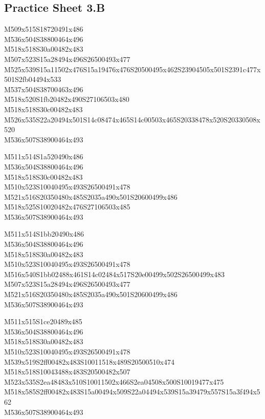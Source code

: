 \documentclass{article}
\begin{document}
\subsection{Practice Sheet 3.B}

\begin{multicols}{5}
\begin{center}

M509x515S18720491x486 %
\\M536x504S38800464x496 %
\\M518x518S30a00482x483 %
\\M507x523S15a28494x496S26500493x477 %
\\M525x539S15a11502x476S15a19476x476S20500495x462S23904505x501S2391c477x501S2fb04494x533 %
\\M537x504S38700463x496 %
\\M518x520S1fb20482x490S27106503x480 %
\\M518x518S30c00482x483 %
\\M526x535S22a20494x501S14c08474x465S14c00503x465S20338478x520S20330508x520 %
\\M536x507S38900464x493 %
\vfil
\columnbreak

M511x514S1a520490x486 %
\\M536x504S38800464x496 %
\\M518x518S30c00482x483 %
\\M510x523S10040495x493S26500491x478 %
\\M521x516S20350480x485S2035a490x501S20600499x486 %
\\M518x525S10020482x476S27106503x485 %
\\M536x507S38900464x493 %
\vfil
\columnbreak

M511x514S1bb20490x486 %
\\M536x504S38800464x496 %
\\M518x518S30a00482x483 %
\\M510x523S10040495x493S26500491x478 %
\\M516x540S1bb02488x461S14c02484x517S20e00499x502S26500499x483 %
\\M507x523S15a28494x496S26500493x477 %
\\M521x516S20350480x485S2035a490x501S20600499x486 %
\\M536x507S38900464x493 %
\vfil
\columnbreak

M511x515S1ce20489x485 %
\\M536x504S38800464x496 %
\\M518x518S30a00482x483 %
\\M510x523S10040495x493S26500491x478 %
\\M539x519S2ff00482x483S10011518x489S20500510x474 %
\\M518x518S10043488x483S20500482x507 %
\\M523x535S2ea48483x510S10011502x466S2ea04508x500S10019477x475 %
\\M518x585S2ff00482x483S15a00494x509S22a04494x539S15a39479x557S15a3f494x562 %
\\M536x507S38900464x493 %
\vfil
\columnbreak


\end{center}
\end{multicols}
\end{document}
